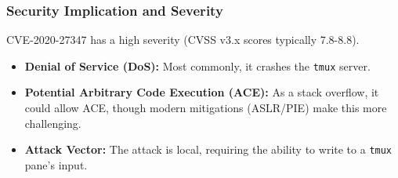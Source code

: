 \subsubsection{Security Implication and Severity}

CVE-2020-27347 has a high severity (CVSS v3.x scores typically 7.8-8.8).
\begin{itemize}
	\item \textbf{Denial of Service (DoS):} Most commonly, it crashes the \texttt{tmux} server.
	\item \textbf{Potential Arbitrary Code Execution (ACE):} As a stack overflow, it could allow ACE, though modern mitigations (ASLR/PIE) make this more challenging.
	\item \textbf{Attack Vector:} The attack is local, requiring the ability to write to a \texttt{tmux} pane's input.
\end{itemize}
